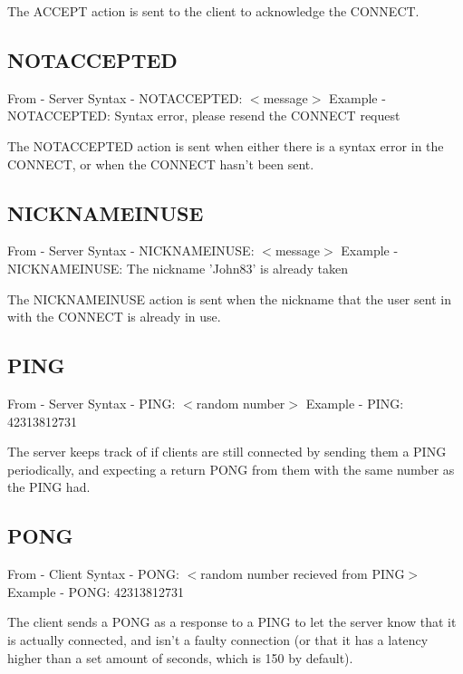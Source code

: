 \documentclass[12pt]{rapport}
\begin{document}
\noindent The ACCEPT action is sent to the client to acknowledge the
CONNECT.

\subsection*{NOTACCEPTED}
From    - Server\newline
Syntax  - NOTACCEPTED: $<$message$>$\newline
Example - NOTACCEPTED: Syntax error, please resend the CONNECT request\newline

\noindent The NOTACCEPTED action is sent when either there is a syntax
error in the CONNECT, or when the CONNECT hasn't been sent.

\subsection*{NICKNAMEINUSE}
From    - Server\newline
Syntax  - NICKNAMEINUSE: $<$message$>$\newline
Example - NICKNAMEINUSE: The nickname 'John83' is already taken\newline

\noindent The NICKNAMEINUSE action is sent when the nickname that the
user sent in with the CONNECT is already in use.

\subsection*{PING}
From    - Server\newline
Syntax  - PING: $<$random number$>$\newline
Example - PING: 42313812731\newline

\noindent The server keeps track of if clients are still connected by
sending them a PING periodically, and expecting a return PONG from
them with the same number as the PING had.

\subsection*{PONG}
From    - Client\newline
Syntax  - PONG: $<$random number recieved from PING$>$\newline
Example - PONG: 42313812731\newline

\noindent The client sends a PONG as a response to a PING to let the
server know that it is actually connected, and isn't a faulty
connection (or that it has a latency higher than a set amount of
seconds, which is 150 by default).
\end{document}
